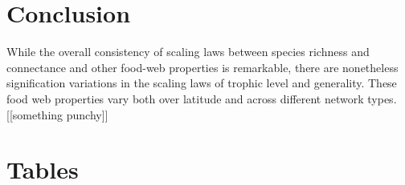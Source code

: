 \documentclass[12pt]{article}
\begin{document}
\section*{Conclusion}

While the overall consistency of scaling laws between species richness and connectance and other food-web properties is 
remarkable, there are nonetheless signification variations in the scaling laws of trophic level and generality. These food web 
properties vary both over latitude and across different network types. [[something punchy]]

\newpage

\newpage

\section*{Tables}
\end{document}
